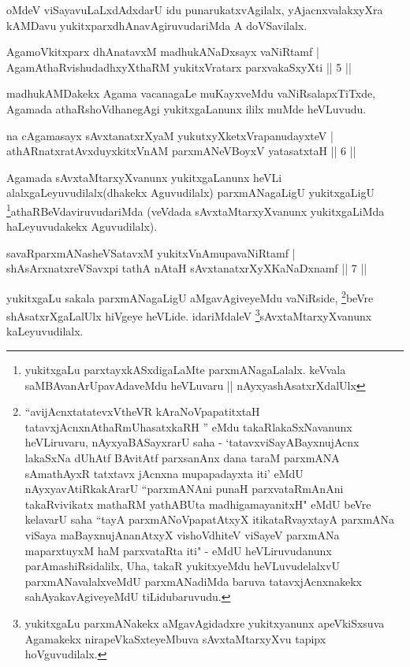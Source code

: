 \begin{artha}
oMdeV viSayavuLaLxdAdxdarU idu punarukatxvAgilalx, yAjacnxvalakxyXra kAMDavu yukitxparxdhAnavAgiruvudariMda A doVSavilalx.
\end{artha}

\begin{shl}
AgamoVkitxparx dhAnatavxM madhukANaDxsayx vaNiRtamf |\\
AgamAthaRvishudadhxyXthaRM yukitxVratarx parxvakaSxyXti \hfill || 5 ||
\end{shl}

\begin{artha}
madhukAMDakekx Agama vacanagaLe muKayxveMdu vaNiRsalapxTiTxde, Agamada athaRshoVdhanegAgi yukitxgaLanunx ililx muMde heVLuvudu.
\end{artha}


\begin{shl}
na cA\s \s gamasayx sAvxtanatxrXyaM yukutxyXketxVrapanudayxteV |\\
athARnatxratAvxduyxkitxVnAM parxmANeVBoyxV yatasatxtaH \hfill || 6 ||
\end{shl}

\begin{artha}
Agamada sAvxtaMtarxyXvanunx yukitxgaLanunx heVLi alalxgaLeyuvudilalx(dhakekx Aguvudilalx) parxmANagaLigU yukitxgaLigU \footnote[1]{yukitxgaLu parxtayxkASxdigaLaMte parxmANagaLalalx. keVvala saMBAvanArUpavAdaveMdu heVLuvaru || nAyxyashAsatxrXdalUlx}athaRBeVdaviruvudariMda (veVdada sAvxtaMtarxyXvanunx yukitxgaLiMda haLeyuvudakekx Aguvudilalx).
\end{artha}


\begin{shl}
savaRparxmANasheVSatavxM yukitxVnAmupavaNiRtamf |\\
shAsArxnatxreVSavxpi tathA nAtaH sAvxtanatxrXyXKaNaDxnamf \hfill || 7 ||
\end{shl}

\begin{artha}
yukitxgaLu sakala parxmANagaLigU aMgavAgiveyeMdu vaNiRside, \footnote[2]{``avijAcnxtatatevxV\s theVR kAraNoVpapatitxtaH tatavxjAcnxnAthaRmUhasatxkaRH '' eMdu takaRlakaSxNavanunx heVLiruvaru, nAyxyaBASayxrarU saha - `tatavxviSayABayxnujAcnx lakaSxNa dUhAtf BAvitAtf parxsanAnx dana taraM parxmANA sAmathAyxR tatxtavx jAcnxna mupapadayxta iti' eMdU nAyxyavAtiRkakArarU ``parxmANAni punaH parxvataRmAnAni takaRvivikatx mathaRM yathABUta madhigamayanitxH" eMdU beVre kelavarU saha ``tayA parxmANoVpapatAtxyX itikataRvayxtayA parxmANa viSaya maBayxnujAnanAtxyX vishoVdhiteV viSayeV parxmANa maparxtuyxM haM parxvataRta iti" - eMdU heVLiruvudanunx parAmashiRsidalilx, Uha, takaR yukitxyeMdu heVLuvudelalxvU parxmANavalalxveMdU parxmANadiMda baruva tatavxjAcnxnakekx sahAyakavAgiveyeMdU tiLidubaruvudu.}beVre shAsatxrXgaLalUlx hiVgeye heVLide. idariMdaleV \footnote[3]{yukitxgaLu parxmANakekx aMgavAgidadxre yukitxyanunx apeVkiSxsuva Agamakekx nirapeVkaSxteyeMbuva sAvxtaMtarxyXvu tapipx hoVguvudilalx.}sAvxtaMtarxyXvanunx kaLeyuvudilalx.
\end{artha}

